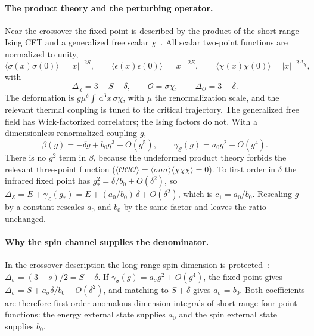 \documentclass[11pt,a4paper]{article}
\numberwithin{equation}{section}
\newcommand{\dd}{\,\mathrm d}
\newcommand{\De}{\Delta_{\mathcal E}}
\newcommand{\Ds}{\Delta_\sigma}
\begin{document}
\paragraph{The product theory and the perturbing operator.} Near the crossover the fixed point is described by the
product of the short-range Ising CFT and a generalized free scalar $\chi$~\cite{Behan:2017dwr,Behan:2017emf}. All
scalar two-point functions are normalized to unity,
\begin{equation}
 \langle\sigma(x)\sigma(0)\rangle=|x|^{-2S},\qquad
 \langle\epsilon(x)\epsilon(0)\rangle=|x|^{-2E},\qquad
 \langle\chi(x)\chi(0)\rangle=|x|^{-2\Delta_\chi},
\end{equation}
with
\begin{equation}
 \Delta_\chi=3-S-\delta,\qquad \mathcal O=\sigma\chi,\qquad \Delta_{\mathcal O}=3-\delta .
\end{equation}
The deformation is $g\mu^\delta\int\dd^3x\,\sigma\chi$, with $\mu$ the renormalization scale, and the relevant
thermal coupling is tuned to the critical trajectory. The generalized free field has Wick-factorized correlators; the
Ising factors do not. With a dimensionless renormalized coupling $g$,
\begin{equation}
 \beta(g)=-\delta g+b_0g^3+O(g^5),\qquad \gamma_{\mathcal E}(g)=a_0g^2+O(g^4).
\end{equation}
There is no $g^2$ term in $\beta$, because the undeformed product theory forbids the relevant three-point function
($\langle\mathcal O\mathcal O\mathcal O\rangle=\langle\sigma\sigma\sigma\rangle\langle\chi\chi\chi\rangle=0$). To
first order in $\delta$ the infrared fixed point has $g_*^2=\delta/b_0+O(\delta^2)$, so
$\De=E+\gamma_{\mathcal E}(g_*)=E+(a_0/b_0)\,\delta+O(\delta^2)$, which is $c_1=a_0/b_0$. Rescaling $g$ by a constant
rescales $a_0$ and $b_0$ by the same factor and leaves the ratio unchanged.

\paragraph{Why the spin channel supplies the denominator.} In the crossover description the long-range spin dimension
is protected~\cite{Behan:2017emf}: $\Ds=(3-s)/2=S+\delta$. If $\gamma_\sigma(g)=a_\sigma g^2+O(g^4)$, the fixed point
gives $\Ds=S+a_\sigma\delta/b_0+O(\delta^2)$, and matching to $S+\delta$ gives $a_\sigma=b_0$. Both coefficients are
therefore first-order anomalous-dimension integrals of short-range four-point functions: the energy external state
supplies $a_0$ and the spin external state supplies $b_0$.
\end{document}
